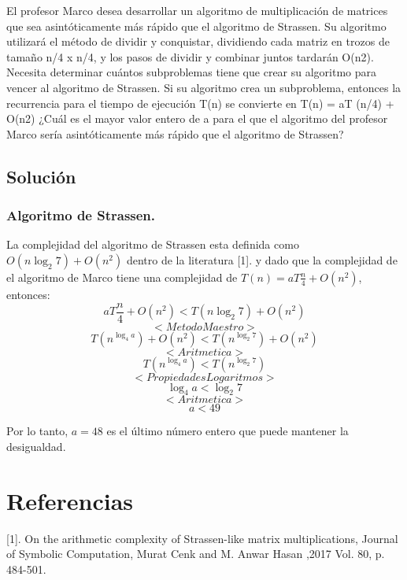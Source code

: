 \documentclass[12pt]{exam}
\begin{document}
El profesor Marco desea desarrollar un algoritmo de multiplicación de matrices
que sea asintóticamente más rápido que el algoritmo de Strassen. Su algoritmo utilizará el
método de dividir y conquistar, dividiendo cada matriz en trozos de tamaño n/4 x n/4, y los
pasos de dividir y combinar juntos tardarán O(n2). Necesita determinar cuántos subproblemas
tiene que crear su algoritmo para vencer al algoritmo de Strassen. Si su algoritmo crea
un subproblema, entonces la recurrencia para el tiempo de ejecución T(n) se convierte en
T(n) = aT (n/4) + O(n2) ¿Cuál es el mayor valor entero de a para el que el algoritmo del
profesor Marco sería asintóticamente más rápido que el algoritmo de Strassen?

\subsection*{Solución}
\subsubsection*{Algoritmo de Strassen.}
La complejidad del algoritmo de Strassen esta definida como $ O(n\log_{2}7)+O(n^2) $ dentro de la
literatura [1]. y dado que la complejidad de el algoritmo de Marco tiene una complejidad
de $ T(n) = aT \frac{n}{4} + O(n^2) $, entonces:
$$ aT \frac{n}{4} + O(n^2) < T(n\log_{2}7) + O(n^2)$$
$$ <Metodo Maestro> $$
$$ T(n^{\log_{4}a}) + O(n^2) < T(n^{\log_{2}7}) + O(n^2)$$
$$ <Aritmetica> $$
$$ T(n^{\log_{4}a}) < T(n^{\log_{2}7})$$
$$ <Propiedades Logaritmos> $$
$$ \log_{4}a < \log_{2}7$$
$$ <Aritmetica> $$
$$ a < 49$$

Por lo tanto, $a = 48$ es el último número entero que puede mantener la desigualdad.



\section*{Referencias}
[1]. On the arithmetic complexity of Strassen-like matrix multiplications, 
Journal of Symbolic Computation, Murat Cenk and M. Anwar Hasan ,2017
Vol. 80, p. 484-501. 
\end{document}
